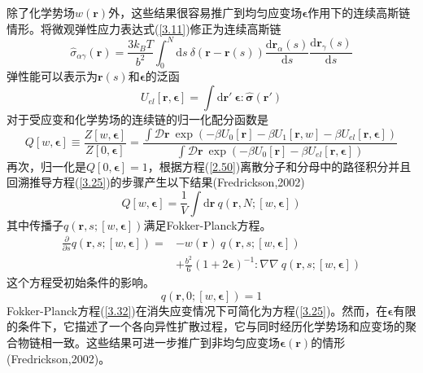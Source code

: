 除了化学势场$w(\mathbf{r})$外，这些结果很容易推广到均匀应变场$\boldsymbol{\epsilon}$作用下的连续高斯链情形。将微观弹性应力表达式(\ref{3.11})修正为连续高斯链
\begin{equation}\label{3.28}
\hat{\sigma}_{\alpha\gamma}(\mathbf{r})=\frac{3k_BT}{b^2}\int_0^N\mathrm{d}s~\delta(\mathbf{r}-\mathbf{r}(s))\frac{\mathrm{d}\mathbf{r}_{\alpha}(s)}{\mathrm{d}s}\frac{\mathrm{d}\mathbf{r}_{\gamma}(s)}{\mathrm{d}s}
\end{equation}
弹性能可以表示为$\mathbf{r}(s)$和$\boldsymbol{\epsilon}$的泛函
\begin{equation}\label{3.29}
U_{el}[\mathbf{r},\boldsymbol{\epsilon}]=\int\mathrm{d}\mathbf{r}'~\boldsymbol{\epsilon}:\hat{\boldsymbol{\sigma}}(\mathbf{r}')
\end{equation}
对于受应变和化学势场的连续链的归一化配分函数是
\begin{equation}\label{3.30}
Q[w,\boldsymbol{\epsilon}]\equiv\frac{Z[w,\boldsymbol{\epsilon}]}{Z[0,\boldsymbol{\epsilon}]}=\frac{\int\mathcal{D}\mathbf{r}~\exp(-\beta U_0[\mathbf{r}]-\beta U_1[\mathbf{r},w]-\beta U_{el}[\mathbf{r},\boldsymbol{\epsilon}])}{\int\mathcal{D}\mathbf{r}~\exp(-\beta U_0[\mathbf{r}]-\beta U_{el}[\mathbf{r},\boldsymbol{\epsilon}])}
\end{equation}
再次，归一化是$Q[0,\boldsymbol{\epsilon}]=1$，根据方程(\ref{2.50})离散分子和分母中的路径积分并且回溯推导方程(\ref{3.25})的步骤产生以下结果(Fredrickson,2002)
\begin{equation}\label{3.31}
Q[w,\boldsymbol{\epsilon}]=\frac{1}{V}\int\mathrm{d}\mathbf{r}~q(\mathbf{r},N;[w,\boldsymbol{\epsilon}])
\end{equation}
其中传播子$q(\mathbf{r},s;[w,\boldsymbol{\epsilon}])$满足Fokker-Planck方程。
\begin{equation}\label{3.32}
\begin{aligned}
\frac{\partial}{\partial s}q(\mathbf{r},s;[w,\boldsymbol{\epsilon}])=&-w(\mathbf{r})~q(\mathbf{r},s;[w,\boldsymbol{\epsilon}])\\
&+\frac{b^2}{6}(1+2\boldsymbol{\epsilon})^{-1}:\nabla\nabla~q(\mathbf{r},s;[w,\boldsymbol{\epsilon}])
\end{aligned}
\end{equation}
这个方程受初始条件的影响。
\begin{equation}\label{3.33}
q(\mathbf{r},0;[w,\boldsymbol{\epsilon}])=1
\end{equation}
Fokker-Planck方程(\ref{3.32})在消失应变情况下可简化为方程(\ref{3.25})。然而，在$\boldsymbol{\epsilon}$有限的条件下，它描述了一个各向异性扩散过程，它与同时经历化学势场和应变场的聚合物链相一致。这些结果可进一步推广到非均匀应变场$\boldsymbol{\epsilon}(\mathbf{r})$的情形(Fredrickson,2002)。
